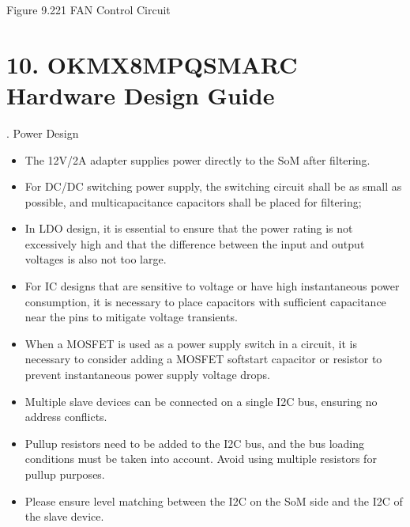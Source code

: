 \documentclass[letterpaper,10pt,openany,english]{sphinxmanual}
\begin{document}
\sphinxAtStartPar
{}

\sphinxAtStartPar
Figure 9.22\sphinxhyphen{}1 FAN Control Circuit


\chapter{10. OK\sphinxhyphen{}MX8MPQ\sphinxhyphen{}SMARC Hardware Design Guide}
\label{\detokenize{hardware:ok-mx8mpq-smarc-hardware-design-guide}}
. Power Design
\begin{itemize}
\item {} 
\sphinxAtStartPar
The 12V/2A adapter supplies power directly to the SoM after filtering.

\item {} 
\sphinxAtStartPar
For DC/DC switching power supply, the switching circuit shall be as small as possible, and multi\sphinxhyphen{}capacitance capacitors shall be placed for filtering;

\item {} 
\sphinxAtStartPar
In LDO design, it is essential to ensure that the power rating is not excessively high and that the difference between the input and output voltages is also not too large.

\item {} 
\sphinxAtStartPar
For IC designs that are sensitive to voltage or have high instantaneous power consumption, it is necessary to place capacitors with sufficient capacitance near the pins to mitigate voltage transients.

\item {} 
\sphinxAtStartPar
When a MOSFET is used as a power supply switch in a circuit, it is necessary to consider adding a MOSFET soft\sphinxhyphen{}start capacitor or resistor to prevent instantaneous power supply voltage drops.

\end{itemize}

\sphinxAtStartPar
{}   
\begin{itemize}
\item {} 
\sphinxAtStartPar
Multiple slave devices can be connected on a single I2C bus, ensuring no address conflicts.

\item {} 
\sphinxAtStartPar
Pull\sphinxhyphen{}up resistors need to be added to the I2C bus, and the bus loading conditions must be taken into account. Avoid using multiple resistors for pull\sphinxhyphen{}up purposes.

\item {} 
\sphinxAtStartPar
Please ensure level matching between the I2C on the SoM side and the I2C of the slave device.

\end{itemize}
\end{document}
